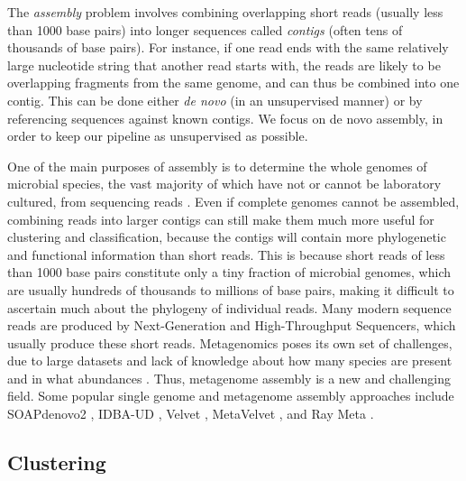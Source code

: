 The \emph{assembly} problem involves combining overlapping short reads (usually less than 1000 base pairs) into longer sequences called \emph{contigs} (often tens of thousands of base pairs). For instance, if one read ends with the same relatively large nucleotide string that another read starts with, the reads are likely to be overlapping fragments from the same genome, and can thus be combined into one contig. This can be done either \emph{de novo} (in an unsupervised manner) or by referencing sequences against known contigs. We focus on de novo assembly, in order to keep our pipeline as unsupervised as possible. 

One of the main purposes of assembly is to determine the whole genomes of microbial species, the vast majority of which have not or cannot be laboratory cultured, from sequencing reads \cite{zerbino08}. Even if complete genomes cannot be assembled, combining reads into larger contigs can still make them much more useful for clustering and classification, because the contigs will contain more phylogenetic and functional information than short reads. This is because short reads of less than 1000 base pairs constitute only a tiny fraction of microbial genomes, which are usually hundreds of thousands to millions of base pairs, making it difficult to ascertain much about the phylogeny of individual reads. Many modern sequence reads are produced by Next-Generation and High-Throughput Sequencers, which usually produce these short reads. Metagenomics poses its own set of challenges, due to large datasets and lack of knowledge about how many species are present and in what abundances \cite{namiki12}. Thus, metagenome assembly is a new and challenging field. Some popular single genome and metagenome assembly approaches include SOAPdenovo2 \cite{luo12}, IDBA-UD \cite{peng12}, Velvet \cite{zerbino08}, MetaVelvet \cite{namiki12}, and Ray Meta \cite{boisvert12}.

\subsection{Clustering}



